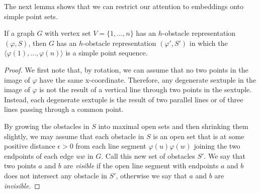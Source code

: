 \documentclass{patmorin}
\begin{document}
The next lemma shows that we can restrict our attention to embeddings
onto simple point sets.

\begin{lem}
  If a graph $G$ with vertex set $V=\{1,\ldots,n\}$ has an
  $h$-obstacle representation $(\varphi, S)$, then $G$ has an
  $h$-obstacle representation $(\varphi',S')$ in which the $\langle
  \varphi(1),\ldots,\varphi(n)\rangle$ is a simple point sequence.
\end{lem}

\begin{proof}
  We first note that, by rotation, we can assume that no two points
  in the image of $\varphi$ have the same x-coordinate.  Therefore,
  any degenerate sextuple in the image of $\varphi$ is not the result
  of a vertical line through two points in the sextuple.  Instead, each
  degenerate sextuple is the result of two parallel lines or of three
  lines passing through a common point.

  By growing the obstacles in $S$ into maximal open sets and then
  shrinking them slightly, we may assume that each obstacle in $S$ is
  an open set that is at some positive distance $\epsilon >0$ from each
  line segment $\varphi(u)\varphi(w)$ joining the two endpoints of each
  edge $uw$ in $G$.  Call this new set of obstacles $S'$.  We say that
  two points $a$ and $b$ are \emph{visible} if the open line segment
  with endpoints $a$ and $b$ does not intersect any obstacle in $S'$,
  otherwise we say that $a$ and $b$ are \emph{invisible}.


\end{proof}
\end{document}
